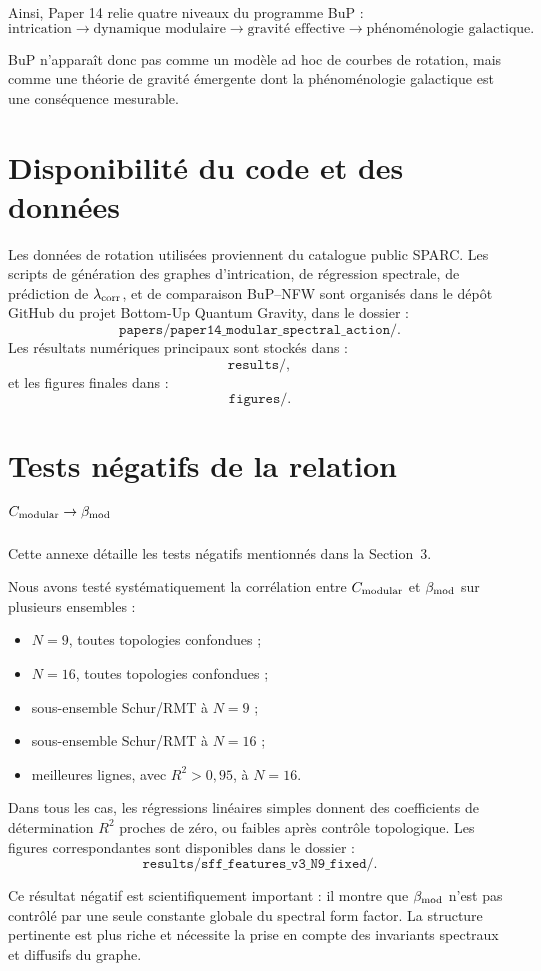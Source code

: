 \documentclass[11pt,a4paper]{article}
\begin{document}
Ainsi, Paper 14 relie quatre niveaux du programme BuP :
\[
\text{intrication}
\rightarrow
\text{dynamique modulaire}
\rightarrow
\text{gravité effective}
\rightarrow
\text{phénoménologie galactique}.
\]

BuP n'apparaît donc pas comme un modèle ad hoc de courbes de rotation, mais
comme une théorie de gravité émergente dont la phénoménologie galactique est
une conséquence mesurable.

\section*{Disponibilité du code et des données}

Les données de rotation utilisées proviennent du catalogue public SPARC.
Les scripts de génération des graphes d'intrication, de régression spectrale,
de prédiction de \(\lambda_{\rm corr}\), et de comparaison BuP--NFW sont
organisés dans le dépôt GitHub du projet Bottom-Up Quantum Gravity, dans le
dossier :
\[
\texttt{papers/paper14\_modular\_spectral\_action/}.
\]
Les résultats numériques principaux sont stockés dans :
\[
\texttt{results/},
\]
et les figures finales dans :
\[
\texttt{figures/}.
\]

\appendix

\section{Tests négatifs de la relation \(C_{\rm modular}\to\beta_{\rm mod}\)}

Cette annexe détaille les tests négatifs mentionnés dans la Section~3.

Nous avons testé systématiquement la corrélation entre \(C_{\rm modular}\) et
\(\beta_{\rm mod}\) sur plusieurs ensembles :

\begin{itemize}
    \item \(N=9\), toutes topologies confondues ;
    \item \(N=16\), toutes topologies confondues ;
    \item sous-ensemble Schur/RMT à \(N=9\) ;
    \item sous-ensemble Schur/RMT à \(N=16\) ;
    \item meilleures lignes, avec \(R^2 > 0{,}95\), à \(N=16\).
\end{itemize}

Dans tous les cas, les régressions linéaires simples donnent des coefficients
de détermination \(R^2\) proches de zéro, ou faibles après contrôle
topologique. Les figures correspondantes sont disponibles dans le dossier :
\[
\texttt{results/sff\_features\_v3\_N9\_fixed/}.
\]

Ce résultat négatif est scientifiquement important : il montre que
\(\beta_{\rm mod}\) n'est pas contrôlé par une seule constante globale du
spectral form factor. La structure pertinente est plus riche et nécessite la
prise en compte des invariants spectraux et diffusifs du graphe.
\end{document}
